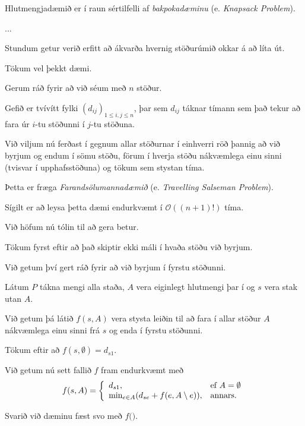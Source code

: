 {
	{
		\item<1-> Hlutmengjadæmið er í raun sértilfelli af \emph{bakpokadæminu} (e. \emph{Knapsack Problem}).
		\item<2-> ...
	}
}

{
	{
		\item<1-> Stundum getur verið erfitt að ákvarða hvernig stöðurúmið okkar á að líta út.
		\item<2-> Tökum vel þekkt dæmi.
		\item<3-> Gerum ráð fyrir að við séum með $n$ stöður.
		\item<4-> Gefið er tvívítt fylki $(d_{ij})_{1 \leq i, j \leq n}$,
					þar sem $d_{ij}$ táknar tímann sem það tekur að fara úr $i$-tu stöðunni í $j$-tu stöðuna.
		\item<5-> Við viljum nú ferðast í gegnum allar stöðurnar í einhverri röð þannig að við	
					byrjum og endum í sömu stöðu, förum í hverja stöðu nákvæmlega einu sinni (tvisvar í upphafsstöðuna) og tökum sem stystan tíma.
		\item<6-> Þetta er fræga \emph{Farandsölumannadæmið} (e. \emph{Travelling Salseman Problem}).
		\item<7-> Sígilt er að leysa þetta dæmi endurkvæmt í $\mathcal{O}((n + 1)!)$ tíma.
		\item<8-> Við höfum nú tólin til að gera betur.
	}
}

{
	{
		\item<1-> Tökum fyrst eftir að það skiptir ekki máli í hvaða stöðu við byrjum.
		\item<2-> Við getum því gert ráð fyrir að við byrjum í fyrstu stöðunni.
		\item<3-> Látum $P$ tákna mengi alla staða, $A$ vera eiginlegt hlutmengi þar í og $s$ vera stak utan $A$.
		\item<4-> Við getum þá látið $f(s, A)$ vera stysta leiðin til að fara í allar stöður $A$ nákvæmlega einu sinni frá $s$ og enda í fyrstu stöðunni.
		\item<5-> Tökum eftir að $f(s, \emptyset) = d_{s1}$.
		\item<6-> Við getum nú sett fallið $f$ fram endurkvæmt með
		\[
			f(s, A) = 
			\left \{
			\env{array}
			{
				{l l}
				d_{s1}, & \text{ef $A = \emptyset$}\\
				\text{min}_{e \in A} (d_{se} + f(e, A \setminus e)), & \text{annars}.
			}
			\right .
		\]
		\item<7-> Svarið við dæminu fæst svo með $f($\onslide<8->{$1, P \setminus \{1\}$}$)$.
	}
}

